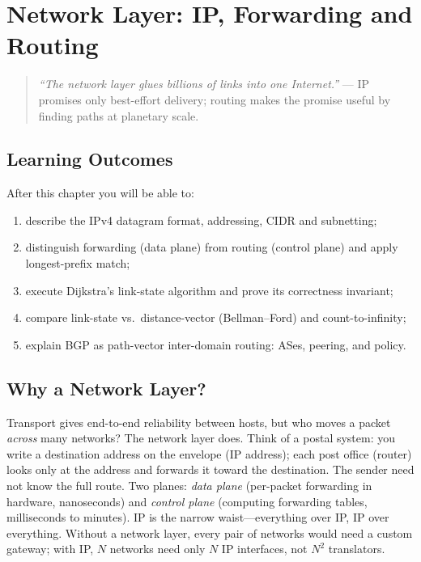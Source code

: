 \chapter{Network Layer: IP, Forwarding and Routing}\label{ch:network-ip}
\begin{quote}
\emph{``The network layer glues billions of links into one Internet.''} --- IP promises only best-effort delivery; routing makes the promise useful by finding paths at planetary scale.
\end{quote}
\noindent{}
\vspace{0.4em}
\section*{Learning Outcomes}
After this chapter you will be able to:
\begin{enumerate}[label=(L\arabic*)]
    \item describe the IPv4 datagram format, addressing, CIDR and subnetting;
    \item distinguish forwarding (data plane) from routing (control plane) and apply longest-prefix match;
    \item execute Dijkstra's link-state algorithm and prove its correctness invariant;
    \item compare link-state vs.\ distance-vector (Bellman--Ford) and count-to-infinity;
    \item explain BGP as path-vector inter-domain routing: ASes, peering, and policy.
\end{enumerate}
\section{Why a Network Layer?}\label{sec:why-network}
Transport gives end-to-end reliability between hosts, but who moves a packet \emph{across} many networks? The network layer does. Think of a postal system: you write a destination address on the envelope (IP address); each post office (router) looks only at the address and forwards it toward the destination. The sender need not know the full route.
Two planes: \emph{data plane} (per-packet forwarding in hardware, nanoseconds) and \emph{control plane} (computing forwarding tables, milliseconds to minutes). IP is the narrow waist---everything over IP, IP over everything. Without a network layer, every pair of networks would need a custom gateway; with IP, $N$ networks need only $N$ IP interfaces, not $N^{2}$ translators.
